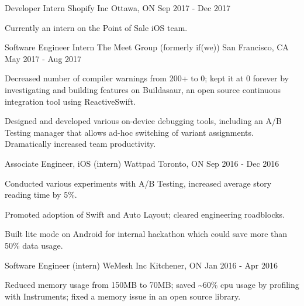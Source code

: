 \begin{cventries}
  \cventry
    {Developer Intern}
    {Shopify Inc}
    {Ottawa, ON}
    {Sep 2017 - Dec 2017}
    {
      \begin{cvitems}
        \item {Currently an intern on the Point of Sale iOS team.}
      \end{cvitems}
    }
  \cventry
    {Software Engineer Intern}
    {The Meet Group (formerly if(we))}
    {San Francisco, CA}
    {May 2017 - Aug 2017}
    {
      \begin{cvitems}
        \item {Decreased number of compiler warnings from 200+ to 0; kept it at 0 forever by investigating and building features on Buildasaur, an open source continuous integration tool using ReactiveSwift. }
        \item {Designed and developed various on-device debugging tools, including an A/B Testing manager that allows ad-hoc switching of variant assignments. Dramatically increased team productivity. }
      \end{cvitems}
    }
  \cventry
    {Associate Engineer, iOS (intern)}
    {Wattpad}
    {Toronto, ON}
    {Sep 2016 - Dec 2016}
    {
      \begin{cvitems}
        \item {Conducted various experiments with A/B Testing, increased average story reading time by 5\%.}
        \item {Promoted adoption of Swift and Auto Layout; cleared engineering roadblocks.}
        \item {Built lite mode on Android for internal hackathon which could save more than 50\% data usage.}
      \end{cvitems} 
    }
  \cventry
    {Software Engineer (intern)}
    {WeMesh Inc}
    {Kitchener, ON}
    {Jan 2016 - Apr 2016}
    {
      \begin{cvitems}
        \item {Reduced memory usage from 150MB to 70MB; saved \textasciitilde60\% cpu usage by profiling with Instruments; fixed a memory issue in an open source library.}
      \end{cvitems}
    }
\end{cventries}
